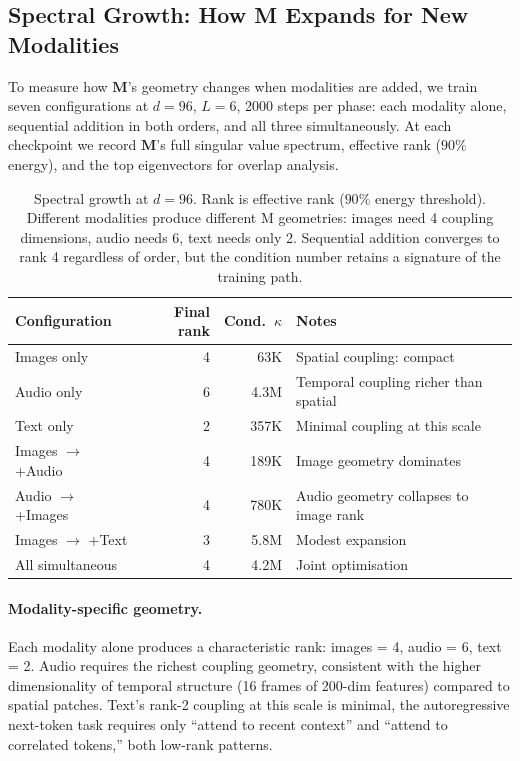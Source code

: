 \documentclass[11pt, a4paper]{article}
\newcommand{\M}{\mathbf{M}}
\theoremstyle{plain}
\theoremstyle{remark}
\begin{document}
\subsection{Spectral Growth: How M Expands for New Modalities}\label{sec:spectral-growth}

To measure how $\M$'s geometry changes when modalities are added, we train seven configurations at $d{=}96$, $L{=}6$, 2000 steps per phase: each modality alone, sequential addition in both orders, and all three simultaneously.
At each checkpoint we record $\M$'s full singular value spectrum, effective rank ($90\%$ energy), and the top eigenvectors for overlap analysis.

\begin{table}[h]
\centering
\small
\begin{tabular}{@{}lrrl@{}}
\toprule
\textbf{Configuration} & \textbf{Final rank} & \textbf{Cond.\ $\kappa$} & \textbf{Notes} \\
\midrule
Images only       & 4 & 63K & Spatial coupling: compact \\
Audio only        & 6 & 4.3M & Temporal coupling richer than spatial \\
Text only         & 2 & 357K & Minimal coupling at this scale \\
\midrule
Images $\to$ +Audio & 4 & 189K & Image geometry dominates \\
Audio $\to$ +Images & 4 & 780K & Audio geometry collapses to image rank \\
Images $\to$ +Text  & 3 & 5.8M & Modest expansion \\
All simultaneous    & 4 & 4.2M & Joint optimisation \\
\bottomrule
\end{tabular}
\caption{Spectral growth at $d{=}96$.  Rank is effective rank ($90\%$ energy threshold).  Different modalities produce different M geometries: images need 4 coupling dimensions, audio needs 6, text needs only 2.  Sequential addition converges to rank 4 regardless of order, but the condition number retains a signature of the training path.}
\label{tab:spectral-growth}
\end{table}

\paragraph{Modality-specific geometry.}
Each modality alone produces a characteristic rank: images = 4, audio = 6, text = 2.
Audio requires the richest coupling geometry, consistent with the higher dimensionality of temporal structure (16 frames of 200-dim features) compared to spatial patches.
Text's rank-2 coupling at this scale is minimal, the autoregressive next-token task requires only ``attend to recent context'' and ``attend to correlated tokens,'' both low-rank patterns.
\end{document}
